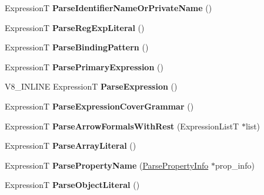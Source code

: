 \begin{DoxyCompactItemize}
ExpressionT {\bfseries Parse\+Identifier\+Name\+Or\+Private\+Name} ()
\item 
\mbox{\label{classv8_1_1internal_1_1ParserBase_a8a10638b048ec117b4f1bc8dee20394b}} 
ExpressionT {\bfseries Parse\+Reg\+Exp\+Literal} ()
\item 
\mbox{\label{classv8_1_1internal_1_1ParserBase_a171070e0c06f06377a320fbcc115b62c}} 
ExpressionT {\bfseries Parse\+Binding\+Pattern} ()
\item 
\mbox{\label{classv8_1_1internal_1_1ParserBase_a547d7588d4f361b57e8114a07174c4d1}} 
ExpressionT {\bfseries Parse\+Primary\+Expression} ()
\item 
\mbox{\label{classv8_1_1internal_1_1ParserBase_a21ee53be40578415554c1d32733fe786}} 
V8\+\_\+\+I\+N\+L\+I\+NE ExpressionT {\bfseries Parse\+Expression} ()
\item 
\mbox{\label{classv8_1_1internal_1_1ParserBase_a0771ca64a53af8907f00374920166384}} 
ExpressionT {\bfseries Parse\+Expression\+Cover\+Grammar} ()
\item 
\mbox{\label{classv8_1_1internal_1_1ParserBase_a8029e3fa9bb3c78f267385c594f76300}} 
ExpressionT {\bfseries Parse\+Arrow\+Formals\+With\+Rest} (Expression\+ListT $\ast$list)
\item 
\mbox{\label{classv8_1_1internal_1_1ParserBase_aad0667b12c340e077d0fd19d1c9f1c92}} 
ExpressionT {\bfseries Parse\+Array\+Literal} ()
\item 
\mbox{\label{classv8_1_1internal_1_1ParserBase_aed42c34797c94b23a97137a15229d52d}} 
ExpressionT {\bfseries Parse\+Property\+Name} (\mbox{\hyperlink{structv8_1_1internal_1_1ParserBase_1_1ParsePropertyInfo}{Parse\+Property\+Info}} $\ast$prop\+\_\+info)
\item 
\mbox{\label{classv8_1_1internal_1_1ParserBase_a7940eb21bdb015a917d8d088c50fb390}} 
ExpressionT {\bfseries Parse\+Object\+Literal} ()

\end{DoxyCompactItemize}
